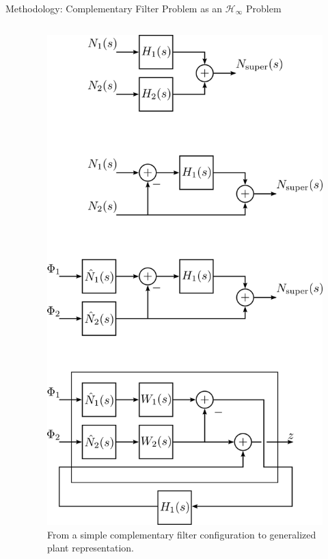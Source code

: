 \documentclass{beamer}
\begin{document}
\begin{frame}[t]
\begin{columns}[t]
\begin{column}{0.32\linewidth}
\begin{block}{Methodology: Complementary Filter Problem as an $\mathcal{H}_\infty$ Problem}
\begin{columns}[t, onlytextwidth]
\begin{column}{0.45\textwidth}
				\end{column}
			\begin{column}{0.5\textwidth}
					\begin{figure}[!h]
					\centering
					\includegraphics[width=1\linewidth]{from_complementary_filter_to_generalized_plant}
					\caption{From a simple complementary filter configuration to generalized plant representation.}
					\label{fig:from_complementary_filter_to_generalized_plant}
					\end{figure}
				\end{column}
			\end{columns}
			

\end{block}
\end{column}
\end{columns}
\end{frame}
\end{document}
